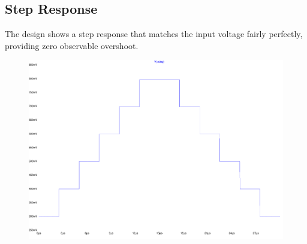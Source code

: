 \subsection{Step Response}

The design shows a step response that matches the input voltage fairly perfectly, providing zero observable overshoot.
\begin{figure}[H]
	\centering
	\includegraphics[width=\textwidth]{./images/StepResponse-out.pdf}
	\caption{}
	\label{fig:step}
\end{figure}
